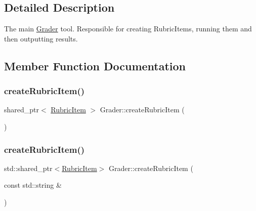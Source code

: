 \subsection{Detailed Description}
The main \hyperlink{class_grader}{Grader} tool. Responsible for creating Rubric\+Items, running them and then outputting results. 

\subsection{Member Function Documentation}
\hypertarget{class_grader_a1fe6c647f25dcbe5559cd04832521358}{}\label{class_grader_a1fe6c647f25dcbe5559cd04832521358} 
\subsubsection{\texorpdfstring{create\+Rubric\+Item()}{createRubricItem()}\hspace{0.1cm}{\footnotesize\ttfamily [1/3]}}
{\footnotesize\ttfamily shared\+\_\+ptr$<$ \hyperlink{class_rubric_item}{Rubric\+Item} $>$ Grader\+::create\+Rubric\+Item (\begin{DoxyParamCaption}{ }\end{DoxyParamCaption})}

\hypertarget{class_grader_a7867718932be3b027457c839d29b52b9}{}\label{class_grader_a7867718932be3b027457c839d29b52b9} 
\subsubsection{\texorpdfstring{create\+Rubric\+Item()}{createRubricItem()}\hspace{0.1cm}{\footnotesize\ttfamily [2/3]}}
{\footnotesize\ttfamily std\+::shared\+\_\+ptr$<$\hyperlink{class_rubric_item}{Rubric\+Item}$>$ Grader\+::create\+Rubric\+Item (\begin{DoxyParamCaption}\item[{const std\+::string \&}]{ }\end{DoxyParamCaption})}

\hypertarget{class_grader_af367b7f22b6df92f3fd9575fad107d50}{}\label{class_grader_af367b7f22b6df92f3fd9575fad107d50} 
